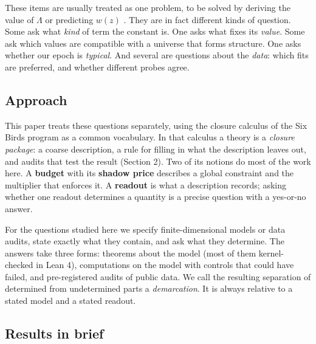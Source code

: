 These items are usually treated as one problem, to be solved by deriving
the value of \(\Lambda\) or predicting \(w(z)\) \citep{Copeland2006}.
They are in fact different kinds of question. Some ask what \emph{kind}
of term the constant is. One asks what fixes its \emph{value}. Some ask
which values are compatible with a universe that forms structure. One
asks whether our epoch is \emph{typical}. And several are questions
about the \emph{data}: which fits are preferred, and whether different
probes agree.

\hypertarget{approach}{%
\subsection{Approach}\label{approach}}

This paper treats these questions separately, using the closure calculus
of the Six Birds program
\citep{TsiokosSixBirds2026, TsiokosFoundations2026} as a common
vocabulary. In that calculus a theory is a \emph{closure package}: a
coarse description, a rule for filling in what the description leaves
out, and audits that test the result (Section 2). Two of its notions do
most of the work here. A \textbf{budget} with its \textbf{shadow price}
describes a global constraint and the multiplier that enforces it. A
\textbf{readout} is what a description records; asking whether one
readout determines a quantity is a precise question with a yes-or-no
answer.

For the questions studied here we specify finite-dimensional models or
data audits, state exactly what they contain, and ask what they
determine. The answers take three forms: theorems about the model (most
of them kernel-checked in Lean 4), computations on the model with
controls that could have failed, and pre-registered audits of public
data. We call the resulting separation of determined from undetermined
parts a \emph{demarcation}. It is always relative to a stated model and
a stated readout.

\hypertarget{results-in-brief}{%
\subsection{Results in brief}\label{results-in-brief}}

